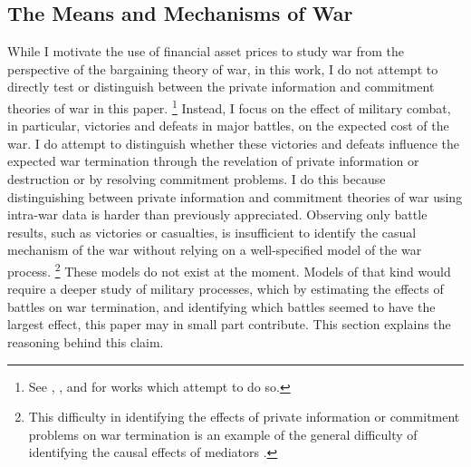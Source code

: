 \subsection{The Means and Mechanisms of War}
\label{bonds_battles:sec:means-mechanisms-war}

While I motivate the use of financial asset prices to study war from the perspective of the bargaining theory of war, in this work, I do not attempt to directly test or distinguish between the private information and commitment theories of war in this paper.%
\footnote{See \textcite{Ramsay2008}, \textcite{Weisiger2015}, and \textcite{Reiter2009} for works which attempt to do so.}
Instead, I focus on the effect of military combat, in particular, victories and defeats in major battles, on the expected cost of the war.
I do attempt to distinguish whether these victories and defeats influence the expected war termination through the revelation of private information or destruction or by resolving commitment problems.
I do this because distinguishing between private information and commitment theories of war using intra-war data is harder than previously appreciated.
Observing only battle results, such as victories or casualties, is insufficient to identify the casual mechanism of the war without relying on a well-specified model of the war process.%
\footnote{This difficulty in identifying the effects of private information or commitment problems on war termination is an example of the general difficulty of identifying the causal effects of mediators \parencite{Keele2015a}.}
These models do not exist at the moment.
Models of that kind would require a deeper study of military processes, which by estimating the effects of battles on war termination, and identifying which battles seemed to have the largest effect, this paper may in small part contribute.
This section explains the reasoning behind this claim.

